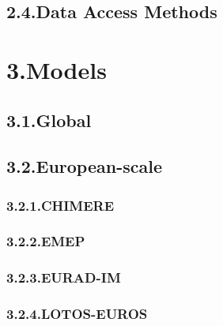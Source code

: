 \documentclass[9pt]{report}
\begin{document}
\subsection{2.4.\hspace*{0.5em}Data Access Methods}\label{sec-data-access-methods}%

\section{3.\hspace*{0.5em}Models}\label{sec-models}%

\subsection{3.1.\hspace*{0.5em}Global}\label{sec-global}%

\subsection{3.2.\hspace*{0.5em}European-scale}\label{sec-european-scale}%

\subsubsection{3.2.1.\hspace*{0.5em}CHIMERE}\label{sec-chimere}%

\subsubsection{3.2.2.\hspace*{0.5em}EMEP}\label{sec-emep}%

\subsubsection{3.2.3.\hspace*{0.5em}EURAD-IM}\label{sec-eurad-im}%

\subsubsection{3.2.4.\hspace*{0.5em}LOTOS-EUROS}\label{sec-lotos-euros}%
\end{document}
